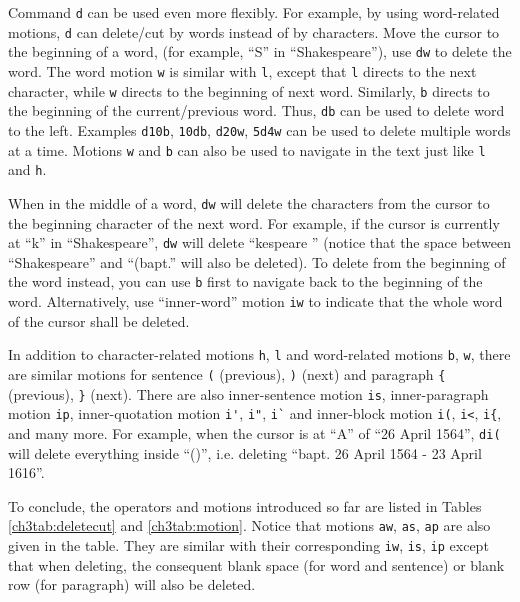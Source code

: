 Command \verb|d| can be used even more flexibly. For example, by using word-related motions, \verb|d| can delete/cut by words instead of by characters. Move the cursor to the beginning of a word, (for example, ``S'' in ``Shakespeare''), use \verb|dw| to delete the word. The word motion \verb|w| is similar with \verb|l|, except that \verb|l| directs to the next character, while \verb|w| directs to the beginning of next word. Similarly, \verb|b| directs to the beginning of the current/previous word. Thus, \verb|db| can be used to delete word to the left. Examples \verb|d10b|, \verb|10db|, \verb|d20w|, \verb|5d4w| can be used to delete multiple words at a time. Motions \verb|w| and \verb|b| can also be used to navigate in the text just like \verb|l| and \verb|h|.

When in the middle of a word, \verb|dw| will delete the characters from the cursor to the beginning character of the next word. For example, if the cursor is currently at ``k'' in ``Shakespeare'', \verb|dw| will delete ``kespeare '' (notice that the space between ``Shakespeare'' and ``(bapt.'' will also be deleted). To delete from the beginning of the word instead, you can use \verb|b| first to navigate back to the beginning of the word. Alternatively, use ``inner-word'' motion \verb|iw| to indicate that the whole word of the cursor shall be deleted.

In addition to character-related motions \verb|h|, \verb|l| and word-related motions  \verb|b|, \verb|w|, there are similar motions for sentence \verb|(| (previous), \verb|)| (next) and paragraph \verb|{| (previous), \verb|}| (next). There are also inner-sentence motion \verb|is|, inner-paragraph motion \verb|ip|, inner-quotation motion \verb|i'|, \verb|i"|, \verb|i`| and inner-block motion \verb|i(|, \verb|i<|, \verb|i{|, and many more. For example, when the cursor is at ``A'' of ``26 April 1564'', \verb|di(| will delete everything inside ``()'', i.e. deleting ``bapt. 26 April 1564 - 23 April 1616''.

To conclude, the operators and motions introduced so far are listed in Tables \ref{ch3tab:deletecut} and \ref{ch3tab:motion}. Notice that motions \verb|aw|, \verb|as|, \verb|ap| are also given in the table. They are similar with their corresponding \verb|iw|, \verb|is|, \verb|ip| except that when deleting, the consequent blank space (for word and sentence) or blank row (for paragraph) will also be deleted.

